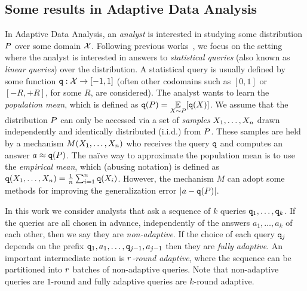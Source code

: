 \subsection{Some results in Adaptive Data Analysis}
In Adaptive Data Analysis, an \emph{analyst} is interested in studying some distribution $P$ over some domain $\mathcal{X}$.  Following previous works~\cite{DworkFHPRR15,HardtU14,BassilyNSSSU16}, we focus on the setting where the analyst is interested in answers to \emph{statistical queries} (also known as \emph{linear queries}) over the distribution.  A statistical query is usually defined by some function ${\tt q} : \mathcal{X} \to [-1,1]$ (often other codomains such as $[0,1]$ or $[-R,+R]$, for some $R$, are considered).  The analyst wants to learn the \emph{population mean}, which is defined as 
$\qquery(\dist) = \ex{\sample \sim \dist}{\qquery(\sample)}$. 
%
We assume that the distribution $P$ can only be accessed via a set of \emph{samples} $X_1,\dots,X_n$ drawn independently and identically distributed (i.i.d.) from $P$.  These samples are held by a mechanism $M(X_1,\dots,X_n)$ who receives the query ${\tt q}$ and computes an answer 
$a \approx {\tt q}(P)$.
%
The na\"ive way to approximate the population mean is to use the \emph{empirical mean}, which (abusing notation) is defined as 
${\tt q}(X_1,\dots,X_n) = \frac{1}{n} \sum_{i=1}^{n} {\tt q}(X_i)$.
However, the mechanism $M$ can adopt some methods for improving the generalization error $| a- {\tt q}(P)|$.

In this work we consider analysts that ask a sequence of $k$ queries ${\tt q}_1,\dots,{\tt q}_k$.  If the queries are all chosen in advance, independently of the answers $a_1,\dots,a_k$ of each other, then we say they are \emph{non-adaptive}.  If the choice of each query ${\tt q}_j$ depends on the prefix ${\tt q}_1,a_1,\dots,{\tt q}_{j-1},a_{j-1}$ then they are \emph{fully adaptive}.  An important intermediate notion is \emph{$r$-round adaptive}, where the sequence can be partitioned into $r$ batches of non-adaptive queries.  Note that non-adaptive queries are $1$-round and fully adaptive queries are $k$-round adaptive.

